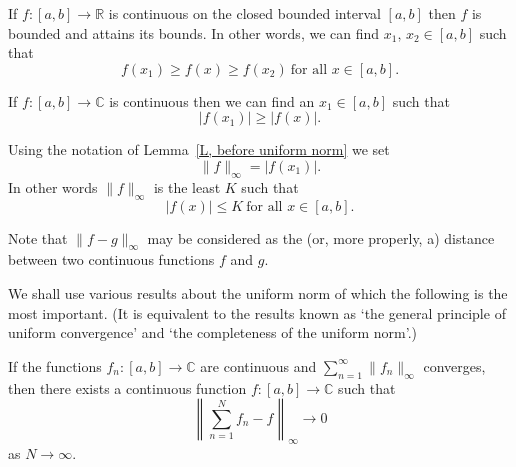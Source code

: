 \begin{lemma} If $f:[a,b]\rightarrow{\mathbb R}$ is continuous
on the closed bounded interval $[a,b]$ then $f$
is bounded and attains its bounds. In other words,
we can find $x_{1},\,x_{2}\in[a,b]$ such that
\[f(x_{1})\geq f(x)\geq f(x_{2})
\ \text{for all $x\in[a,b]$}.\]
\end{lemma}
\begin{lemma}\label{L, before uniform norm}
If $f:[a,b]\rightarrow{\mathbb C}$ is continuous
then we can find an $x_{1}\in[a,b]$ such that
\[|f(x_{1})|\geq |f(x)|.\]
\end{lemma}
\begin{definition}\label{D, uniform norm} Using the notation
of Lemma~\ref{L, before uniform norm} we set
\[\|f\|_{\infty}=|f(x_{1})|.\]
In other words $\|f\|_{\infty}$ is the least $K$ such that
\[|f(x)|\leq K\ \text{for all $x\in[a,b]$}.\]
\end{definition}
Note that $\|f-g\|_{\infty}$ may be considered as the
(or, more properly, a) distance between two continuous functions
$f$ and $g$.

We shall use various results about the uniform
norm of which the following is the most important.
(It is equivalent to the results known as `the general principle
of uniform convergence' and `the completeness of the uniform norm'.)
\begin{lemma} If the functions
$f_{n}:[a,b]\rightarrow{\mathbb C}$ are continuous
and $\sum_{n=1}^{\infty}\|f_{n}\|_{\infty}$
converges, then there exists a continuous function
$f:[a,b]\rightarrow{\mathbb C}$ such that
\[\left\|\sum_{n=1}^{N}f_{n}-f\right\|_{\infty}\rightarrow 0\]
as $N\rightarrow\infty$.
\end{lemma}
